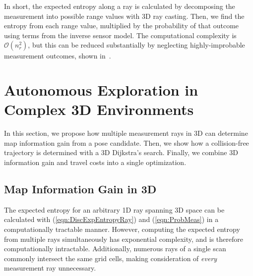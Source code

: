\documentclass[conf]{new-aiaa}
\newcommand{\refeqn}[1]{(\ref{eqn:#1})}
\begin{document}
In short, the expected entropy along a ray is calculated by decomposing the measurement into possible range values with 3D ray casting. Then, we find the entropy from each range value, multiplied by the probability of that outcome using terms from the inverse sensor model. The computational complexity is $\mathcal O(n_r^2)$, but this can be reduced substantially by neglecting highly-improbable measurement outcomes, shown in~\cite{KauAiLee16}.


\section{Autonomous Exploration in Complex 3D Environments}
\label{sec:Explore3D}

In this section, we propose how multiple measurement rays in 3D can determine map information gain from a pose candidate. Then, we show how a collision-free trajectory is determined with a 3D Dijkstra's search. Finally, we combine 3D information gain and travel costs into a single optimization.

\subsection{Map Information Gain in 3D}

The expected entropy for an arbitrary 1D ray spanning 3D space can be calculated with \refeqn{DiscExpEntropyRay} and \refeqn{ProbMeas} in a computationally tractable manner. However, computing the expected entropy from multiple rays simultaneously has exponential complexity, and is therefore computationally intractable. Additionally, numerous rays of a single scan commonly intersect the same grid cells, making consideration of \emph{every} measurement ray unnecessary.
\end{document}
